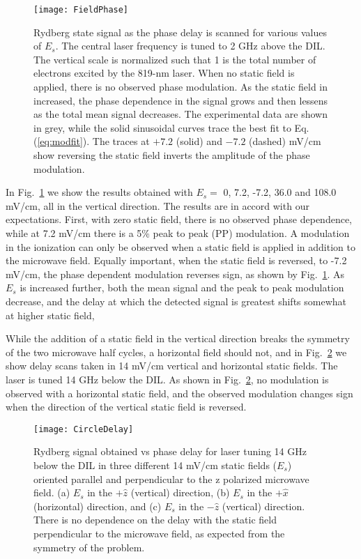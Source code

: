 \documentclass[aps,pra,reprint,groupedaddress]{revtex4-1}
\begin{document}
\begin{figure}
	\texttt{[image: FieldPhase]}
	\caption{Rydberg state signal as the phase delay is scanned for various values of $E_s$. The central laser frequency is tuned to 2 GHz above the DIL. The vertical scale is normalized such that 1 is the total number of electrons excited by the 819-nm laser. When no static field is applied, there is no observed phase modulation. As the static field in increased, the phase dependence in the signal grows and then lessens as the total mean signal decreases. The experimental data are shown in grey, while the solid sinusoidal curves trace the best fit to Eq. (\ref{eq:modfit}). The traces at $+7.2$ (solid) and $-7.2$ (dashed) mV/cm show reversing the static field inverts the amplitude of the phase modulation.}
	\label{fig:fph}
\end{figure}

In Fig.~\ref{fig:fph} we show the results obtained with $E_{s}=$ 0, 7.2, -7.2, 36.0 and 108.0 mV/cm, all in the vertical direction. The results are in accord with our expectations. First, with zero static field, there is no observed phase dependence, while at 7.2 mV/cm there is a 5\% peak to peak (PP) modulation. A modulation in the ionization can only be observed when a static field is applied in addition to the microwave field. Equally important, when the static field is reversed, to -7.2 mV/cm, the phase dependent modulation reverses sign, as shown by Fig.~\ref{fig:fph}. As $E_s$ is increased further, both the mean signal and the peak to peak modulation decrease, and the delay at which the detected signal is greatest shifts somewhat at higher static field,

While the addition of a static field in the vertical direction breaks the symmetry of the two microwave half cycles, a horizontal field should not, and in Fig.~\ref{fig:CircleDelay} we show delay scans taken in 14 mV/cm vertical and horizontal static fields. The laser is tuned 14 GHz below the DIL. As shown in Fig.~\ref{fig:CircleDelay}, no modulation is observed with a horizontal static field, and the observed modulation changes sign when the direction of the vertical static field is reversed.

\begin{figure}
	\texttt{[image: CircleDelay]}
	\caption{Rydberg signal obtained vs phase delay for laser tuning 14 GHz below the DIL in three different 14 mV/cm static fields ($E_s$) oriented parallel and perpendicular to the z polarized microwave field. (a) $E_s$ in the $+\hat{z}$ (vertical) direction, (b) $E_s$ in the $+\hat{x}$ (horizontal) direction, and (c) $E_s$ in the $-\hat{z}$ (vertical) direction. There is no dependence on the delay with the static field perpendicular to the microwave field, as expected from the symmetry of the problem.}
	\label{fig:CircleDelay}
\end{figure}
\end{document}
